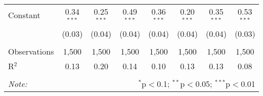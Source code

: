 \documentclass[
]{article}
\begin{document}
\begin{sidewaystable}[!htbp]
\begin{tabular}{@{\extracolsep{1pt}}lccccccc}
  Constant & 0.34$^{***}$ & 0.25$^{***}$ & 0.49$^{***}$ & 0.36$^{***}$ & 0.20$^{***}$ & 0.35$^{***}$ & 0.53$^{***}$ \\ 
  & (0.03) & (0.04) & (0.04) & (0.04) & (0.04) & (0.04) & (0.03) \\ 
 \hline \\[-1.8ex] 
Observations & 1,500 & 1,500 & 1,500 & 1,500 & 1,500 & 1,500 & 1,500 \\ 
R$^{2}$ & 0.13 & 0.20 & 0.14 & 0.10 & 0.13 & 0.13 & 0.08 \\ 
\hline 
\hline \\[-1.8ex] 
\textit{Note:}  & \multicolumn{7}{r}{$^{*}$p$<$0.1; $^{**}$p$<$0.05; $^{***}$p$<$0.01} \\ 
\end{tabular} 
\end{sidewaystable}
\end{document}
